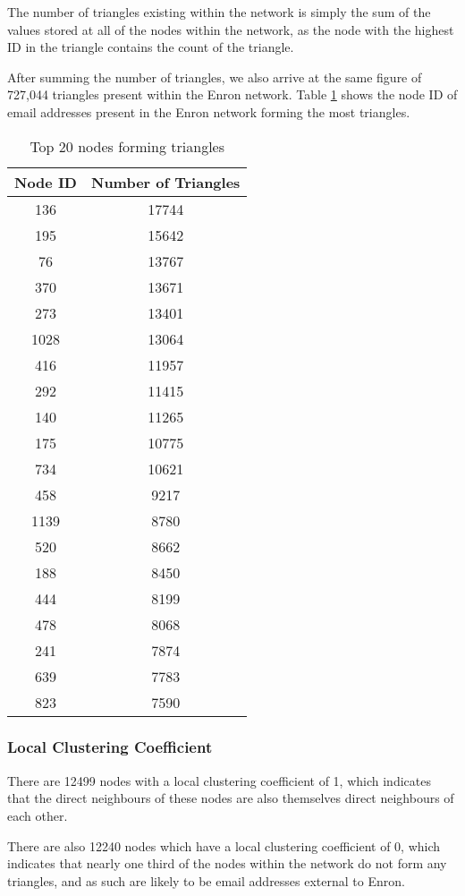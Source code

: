 The number of triangles existing within the network is simply the sum of the values stored at all of the nodes within the network, as the node with the highest ID in the triangle contains the count of the triangle.

After summing the number of triangles, we also arrive at the same figure of 727,044 triangles present within the Enron network. Table \ref{tab:enrontriangles} shows the node ID of email addresses present in the Enron network forming the most triangles.

\begin{table}%
\centering
\begin{tabular}{|c|c|}
\hline
Node ID & Number of Triangles \\
\hline
136 & 17744 \\
195 & 15642 \\
76 & 13767 \\
370 & 13671 \\
273 & 13401 \\
1028 & 13064 \\
416 & 11957 \\
292 & 11415 \\
140 & 11265 \\
175 & 10775 \\
734 & 10621 \\
458 & 9217 \\
1139 & 8780 \\
520 & 8662 \\
188 & 8450 \\
444 & 8199 \\
478 & 8068 \\
241 & 7874 \\
639 & 7783 \\
823 & 7590 \\
\hline
\end{tabular}
\caption{Top 20 nodes forming triangles}
\label{tab:enrontriangles}
\end{table}

\subsubsection{Local Clustering Coefficient}
There are 12499 nodes with a local clustering coefficient of 1, which indicates that the direct neighbours of these nodes are also themselves direct neighbours of each other.

There are also 12240 nodes which have a local clustering coefficient of 0, which indicates that nearly one third of the nodes within the network do not form any triangles, and as such are likely to be email addresses external to Enron.

